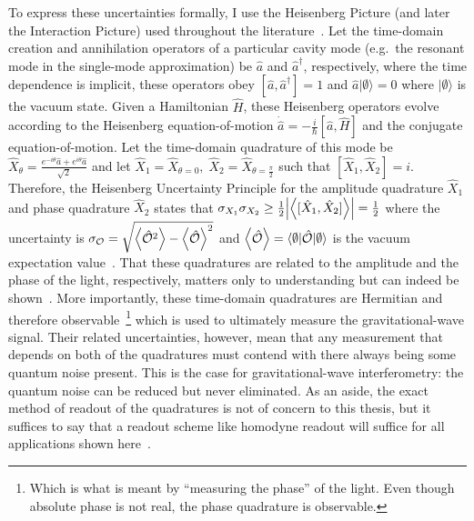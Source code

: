 To express these uncertainties formally, I use the Heisenberg Picture (and later the Interaction Picture) used throughout the literature~\cite{Danilishin,}. Let the time-domain creation and annihilation operators of a particular cavity mode (e.g.\ the resonant mode in the single-mode approximation) be $\hat{a}$ and $\hat{a}^\dag$, respectively, where the time dependence is implicit, these operators obey $[\hat{a},\hat{a}^\dag]=1$ and $\hat{a}\lvert\emptyset\rangle=0$ where $\lvert\emptyset\rangle$ is the vacuum state. Given a Hamiltonian $\hat H$, these Heisenberg operators evolve according to the Heisenberg equation-of-motion $\dot{\hat{a}}=-\frac{i}{\hbar} [\hat a, \hat H]$ and the conjugate equation-of-motion. Let the time-domain quadrature of this mode be $\hat{X}_\theta=\frac{e^{-i \theta}\hat{a}+e^{i \theta}\hat{a}}{\sqrt{2}}$ and let $\hat{X}_1=\hat{X}_{\theta=0},\; \hat{X}_2=\hat{X}_{\theta=\frac{\pi}{2}}$ such that $[\hat{X}_1,\hat{X}_2]=i$. Therefore, the Heisenberg Uncertainty Principle for the amplitude quadrature $\hat{X}_1$ and phase quadrature $\hat{X}_2$ states that $\sigma_{X_1}\sigma_{X_2}\geq\frac{1}{2}\abs{\ev{[\hat{X}_1,\hat{X}_2]}}=\frac{1}{2}$ where the uncertainty is $\sigma_\mathcal{O}=\sqrt{\ev{\hat{\mathcal{O}}^2}-\ev{\hat{\mathcal{O}}}^2}$ and $\ev{\hat{\mathcal{O}}}=\langle\emptyset\lvert\hat{\mathcal{O}}\rvert\emptyset\rangle$ is the vacuum expectation value~\cite{}. That these quadratures are related to the amplitude and the phase of the light, respectively, matters only to understanding but can indeed be shown~\cite{Danilishin}. More importantly, these time-domain quadratures are Hermitian and therefore observable~\footnote{Which is what is meant by ``measuring the phase'' of the light. Even though absolute phase is not real, the phase quadrature is observable.} which is used to ultimately measure the gravitational-wave signal. Their related uncertainties, however, mean that any measurement that depends on both of the quadratures must contend with there always being some quantum noise present. This is the case for gravitational-wave interferometry: the quantum noise can be reduced but never eliminated. 
As an aside, the exact method of readout of the quadratures is not of concern to this thesis, but it suffices to say that a readout scheme like homodyne readout will suffice for all applications shown here~\cite{}.

